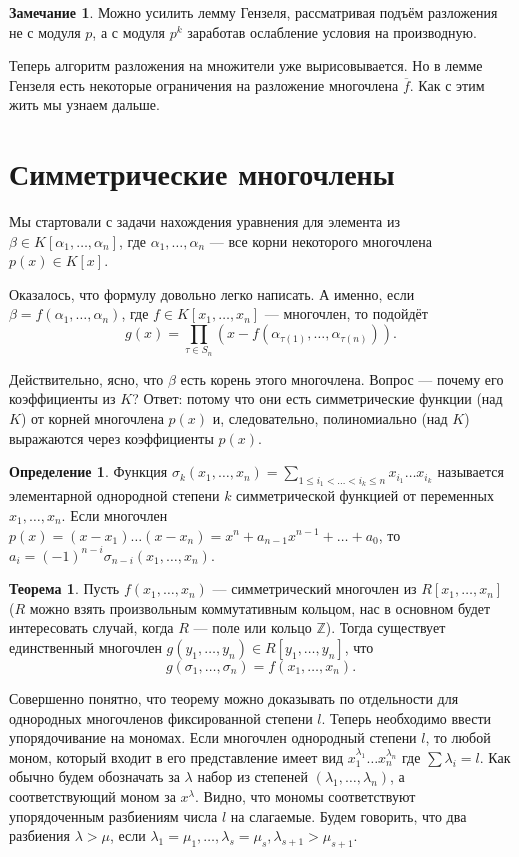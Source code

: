 \documentclass[10pt,a4paper,oneside]{book}
\theoremstyle{definition}
\newtheorem*{rem}{Замечание}
\newtheorem*{defn}{{\color{yellow!20!red} Определение}}
\newtheorem{thm}{{\color{red!40!black} Теорема}}
\newcommand{\mb}[1]{\mathbb{#1}}
\newcommand{\ovl}{\overline}
\def\rm{\begin{rem}}
\def\erm{\end{rem}}
\begin{document}
\rm Можно усилить лемму Гензеля, рассматривая подъём разложения не с модуля $p$, а с модуля $p^k$ заработав ослабление условия на производную.
\erm


Теперь алгоритм разложения на множители уже вырисовывается. Но в лемме Гензеля есть некоторые ограничения на разложение многочлена $\ovl{f}$. Как с этим жить мы узнаем дальше.




   









\section{Симметрические многочлены}

Мы стартовали с задачи нахождения уравнения для элемента из $\beta \in K[\alpha_1, \dots, \alpha_n]$, где $\alpha_1,\dots, \alpha_n$ --- все корни некоторого многочлена $p(x)\in K[x]$. 

Оказалось, что формулу довольно легко написать. А именно, если $\beta=f(\alpha_1, \dots, \alpha_n)$, где $f\in K[x_1,\dots,x_n]$ --- многочлен, то подойдёт
 $$g(x)=\prod_{\tau \in S_n} (x - f(\alpha_{\tau(1)}, \dots, \alpha_{\tau(n)})).$$

Действительно, ясно, что $\beta$ есть корень этого многочлена. Вопрос --- почему его коэффициенты из $K$? Ответ: потому что они есть симметрические функции (над $K$) от корней многочлена $p(x)$ и, следовательно, полиномиально (над $K$) выражаются через коэффициенты $p(x)$. 

\begin{defn}
Функция $\sigma_k(x_1,\dots, x_n)= \sum_{1\leq i_1<\dots<i_k\leq n}x_{i_1}\dots x_{i_k}$ называется элементарной однородной степени $k$ симметрической функцией от переменных $x_1,\dots, x_n$. Если многочлен $p(x)=(x-x_1)\dots(x-x_n)=x^n+a_{n-1}x^{n-1}+\dots+a_0$, то $a_i=(-1)^{n-i}\sigma_{n-i}(x_1,\dots, x_n)$.
\end{defn}

\begin{thm} Пусть $f(x_1,\dots, x_n)$ --- симметрический многочлен из $R[x_1,\dots, x_n]$ ($R$ можно взять произвольным коммутативным кольцом, нас в основном будет интересовать случай, когда $R$ --- поле или кольцо $\mb Z$). Тогда существует единственный многочлен $g(y_1, \dots, y_n)\in R[y_1,\dots, y_n]$, что  $$g(\sigma_1, \dots, \sigma_n)=f(x_1, \dots, x_n).$$
\end{thm}
\proof
Совершенно понятно, что теорему можно доказывать по отдельности для однородных многочленов фиксированной степени $l$. Теперь необходимо ввести упорядочивание на мономах. Если многочлен однородный степени $l$, то любой моном, который входит в его представление имеет вид $x_1^{\lambda_1}\dots x_n^{\lambda_n}$ где $\sum \lambda_i = l$. Как обычно будем обозначать за $\lambda$ набор из степеней $(\lambda_1,\dots,\lambda_n)$, а соответствующий моном за $x^{\lambda}$. Видно, что мономы соответствуют упорядоченным разбиениям числа $l$ на слагаемые. Будем говорить, что два разбиения $\lambda>\mu$, если $\lambda_1=\mu_1,\dots, \lambda_s=\mu_s, \lambda_{s+1}>\mu_{s+1}$.
\end{document}
